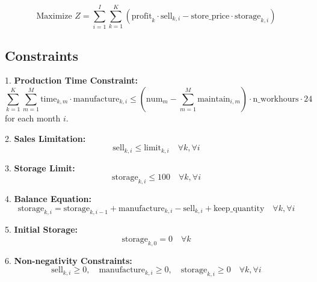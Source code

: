 \documentclass{article}
\begin{document}
\[
\text{Maximize } Z = \sum_{i=1}^{I} \sum_{k=1}^{K} \left( \text{profit}_k \cdot \text{sell}_{k,i} - \text{store\_price} \cdot \text{storage}_{k,i} \right)
\]

\subsection*{Constraints}

1. \textbf{Production Time Constraint:}
\[
\sum_{k=1}^{K} \sum_{m=1}^{M} \text{time}_{k,m} \cdot \text{manufacture}_{k,i} \leq \left( \text{num}_m - \sum_{m=1}^{M} \text{maintain}_{i,m} \right) \cdot \text{n\_workhours} \cdot 24
\]
for each month \( i \).

2. \textbf{Sales Limitation:}
\[
\text{sell}_{k,i} \leq \text{limit}_{k,i} \quad \forall k, \forall i
\]

3. \textbf{Storage Limit:}
\[
\text{storage}_{k,i} \leq 100 \quad \forall k, \forall i
\]

4. \textbf{Balance Equation:}
\[
\text{storage}_{k,i} = \text{storage}_{k,i-1} + \text{manufacture}_{k,i} - \text{sell}_{k,i} + \text{keep\_quantity} \quad \forall k, \forall i
\]

5. \textbf{Initial Storage:}
\[
\text{storage}_{k,0} = 0 \quad \forall k
\]

6. \textbf{Non-negativity Constraints:}
\[
\text{sell}_{k,i} \geq 0, \quad \text{manufacture}_{k,i} \geq 0, \quad \text{storage}_{k,i} \geq 0 \quad \forall k, \forall i
\]
\end{document}
